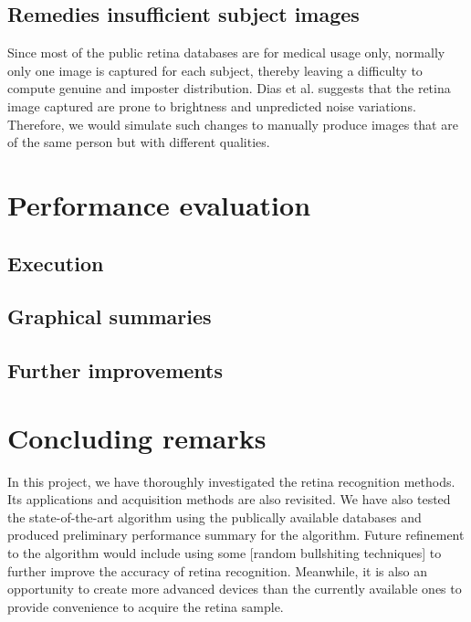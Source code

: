 \documentclass[a4paper,11pt]{article}
\theoremstyle{plain} %
\begin{document}
\subsection{Remedies insufficient subject images}
Since most of the public retina databases are for medical usage only, normally only one image is captured for each subject, thereby leaving a difficulty to compute genuine and imposter distribution. Dias et al. \cite{dias2014retinal} suggests that the retina image captured are prone to brightness and unpredicted noise variations. Therefore, we would simulate such changes to manually produce images that are of the same person but with different qualities. 


\section{Performance evaluation}

\subsection{Execution}

\subsection{Graphical summaries}

\subsection{Further improvements}


\section{Concluding remarks}
In this project, we have thoroughly investigated the retina recognition methods. Its applications and acquisition methods are also revisited. We have also tested the state-of-the-art algorithm using the publically available databases and produced preliminary performance summary for the algorithm. Future refinement to the algorithm would include using some [random bullshiting techniques] to further improve the accuracy of retina recognition. Meanwhile, it is also an opportunity to create more advanced devices than the currently available ones to provide convenience to acquire the retina sample.




\end{document}
